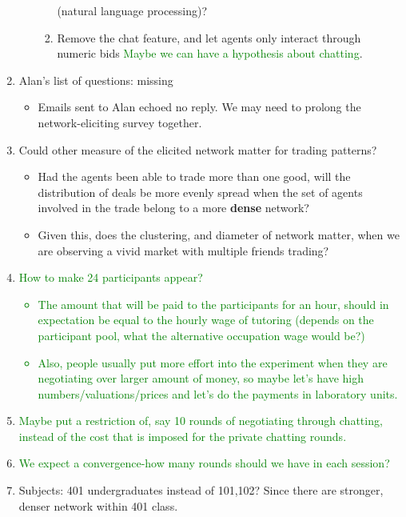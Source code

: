 \documentclass{article}
\begin{document}
\begin{enumerate}
\begin{itemize}
\begin{enumerate}
                        (natural language processing)?
                    \item Remove the chat feature, and let agents only interact
                        through numeric bids \textcolor{green}{Maybe we can have a hypothesis about chatting}.
                \end{enumerate}
        \end{itemize}
    \item Alan's list of questions: missing
        \begin{itemize}
            \item Emails sent to Alan echoed no reply. We may need to prolong
                the network-eliciting survey together.
        \end{itemize}
    \item Could other measure of the elicited network matter for trading
        patterns?
        \begin{itemize}
            \item Had the agents been able to trade more than one good, will the
                distribution of deals be more evenly spread when the set of
                agents involved in the trade belong to a more \textbf{dense}
                network?
            \item Given this, does the clustering, and diameter of network
                matter, when we are observing a vivid market with multiple
                friends trading?
        \end{itemize}
        \item \textcolor{green}{How to make 24 participants appear?
        \begin{itemize}
            \item The amount that will be paid to the participants for an hour, should in expectation be equal to the hourly wage of tutoring (depends on the participant pool, what the alternative occupation wage would be?)
            \item Also, people usually put more effort into the experiment when they are negotiating over larger amount of money, so maybe let's have high numbers/valuations/prices and let's do the payments in laboratory units.
        \end{itemize}}
        
        \item \textcolor{green}{Maybe put a restriction of, say 10 rounds of negotiating through chatting, instead of the cost that is imposed for the private chatting rounds.}
       
       \item \textcolor{green}{We expect a convergence-how many rounds should we have in each session?}
       
       \item Subjects: 401 undergraduates instead of 101,102? Since there are stronger, denser network within 401 class. 

\end{enumerate}




%
%
%
\end{document}
